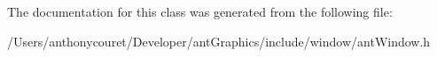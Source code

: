 The documentation for this class was generated from the following file\+:\begin{DoxyCompactItemize}
\item 
/\+Users/anthonycouret/\+Developer/ant\+Graphics/include/window/ant\+Window.\+h\end{DoxyCompactItemize}
